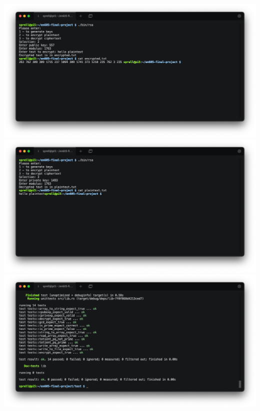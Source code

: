 \documentclass{article}
\begin{document}
\includegraphics[scale=0.40]{assets/encrypt.png}
\includegraphics[scale=0.40]{assets/decrypt.png}
\includegraphics[scale=0.40]{assets/rust-tests.png}

\end{document}
